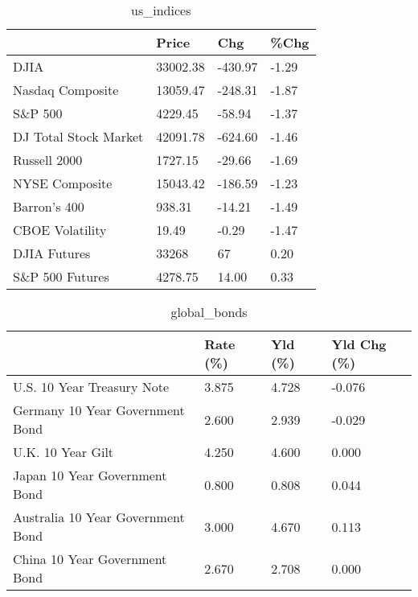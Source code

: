 \documentclass{article}%
\begin{document}
%


\begin{table}[htbp]%
\caption{us\_indices}%
\centering%
\begin{adjustbox}{width=1\textwidth}%
\begin{tabular}{llll}
\toprule
                      &    Price &     Chg &  \%Chg \\
\midrule
                 DJIA & 33002.38 & -430.97 & -1.29 \\
     Nasdaq Composite & 13059.47 & -248.31 & -1.87 \\
              S\&P 500 &  4229.45 &  -58.94 & -1.37 \\
DJ Total Stock Market & 42091.78 & -624.60 & -1.46 \\
         Russell 2000 &  1727.15 &  -29.66 & -1.69 \\
       NYSE Composite & 15043.42 & -186.59 & -1.23 \\
         Barron's 400 &   938.31 &  -14.21 & -1.49 \\
      CBOE Volatility &    19.49 &   -0.29 & -1.47 \\
         DJIA Futures &    33268 &      67 &  0.20 \\
      S\&P 500 Futures &  4278.75 &   14.00 &  0.33 \\
\bottomrule
\end{tabular}
%
\end{adjustbox}%
\end{table}

%


\begin{table}[htbp]%
\caption{global\_bonds}%
\centering%
\begin{adjustbox}{width=1\textwidth}%
\begin{tabular}{llll}
\toprule
                                  & Rate (\%) & Yld (\%) & Yld Chg (\%) \\
\midrule
       U.S. 10 Year Treasury Note &    3.875 &   4.728 &      -0.076 \\
  Germany 10 Year Government Bond &    2.600 &   2.939 &      -0.029 \\
                U.K. 10 Year Gilt &    4.250 &   4.600 &       0.000 \\
    Japan 10 Year Government Bond &    0.800 &   0.808 &       0.044 \\
Australia 10 Year Government Bond &    3.000 &   4.670 &       0.113 \\
    China 10 Year Government Bond &    2.670 &   2.708 &       0.000 \\
\bottomrule
\end{tabular}
%
\end{adjustbox}%
\end{table}
\end{document}
